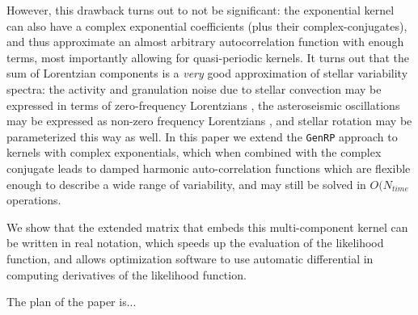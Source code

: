 \documentclass[manuscript, letterpaper]{aastex6}
\makeatletter
\let\origsection\section
\renewcommand\section{\@ifstar{\starsection}{\nostarsection}}
\newcommand\nostarsection[1]{\sectionprelude\origsection{#1}}
\newcommand\starsection[1]{\sectionprelude\origsection*{#1}}
\newcommand\sectionprelude{\vspace{1em}}
\makeatother
\begin{document}
However, this drawback turns out to not be significant:  the exponential kernel
can also have a complex exponential coefficients (plus their complex-conjugates), and
thus approximate an almost arbitrary autocorrelation function with enough terms, most
importantly allowing for quasi-periodic kernels.  It turns out that the sum of Lorentzian
components is a {\it very} good approximation of stellar variability spectra:  the
activity and granulation noise due to stellar convection may be expressed in terms of zero-frequency
Lorentzians \citep{1985ESASP.235..199H}, the asteroseismic oscillations may be expressed as non-zero frequency
Lorentzians \citep{1990ApJ...364..699A,Gruberbauer2009}, and stellar rotation may be
parameterized this way as well.  In this paper
we extend the \texttt{GenRP} approach to kernels with complex exponentials, which when
combined with the complex conjugate leads to damped harmonic auto-correlation functions
which are flexible enough to describe a wide range of variability, and may still
be solved in $O(N_{time}$ operations.

We show that the extended matrix that embeds this multi-component kernel can be written
in real notation, which speeds up the evaluation of the likelihood function,
and allows optimization software to use automatic differential in computing
derivatives of the likelihood function.

The plan of the paper is...


\section{Outline}
\end{document}
